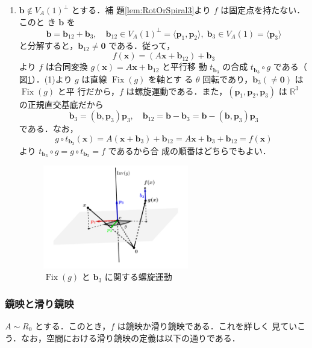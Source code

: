 \documentclass[11pt, uplatex, dvipdfmx, titlepage]{jsarticle}
\makeatletter
\DeclareMathOperator{\Fix}{Fix}
\renewenvironment{proof}[1][\proofname]{\par
  \pushQED{\qed}%
  \normalfont \topsep6\p@\@plus6\p@\relax
  \trivlist
  \item[\hskip\labelsep
         \bfseries
    {#1}]\ignorespaces
}{%
  \popQED\endtrivlist\@endpefalse
}
\theoremstyle{definition}
\renewcommand{\proofname}{\textbf{証明}}
\makeatother
\begin{document}
\begin{proof}[定理\ref{thm:RotOrSpiral3}の証明]
\begin{enumerate}[(1)]
  \item $\bm{b} \notin V_A(1)^{\perp}$ とする．補
    題\ref{lem:RotOrSpiral3}より $f$ は固定点を持たない．このと
    き $\bm{b}$ を
    \[
      \bm{b} = \bm{b}_{12} + \bm{b}_3 , \quad \bm{b}_{12} \in
      V_A(1)^{\perp}=\langle \bm{p}_1, \bm{p}_2 \rangle, \; \bm{b}_{3} \in
      V_A(1)=\langle \bm{p}_3\rangle
    \]
    と分解すると，$\bm{b}_{12} \neq \bm{0}$ である．従って，
    \[
      f(\bm{x}) = \left( A\bm{x} + \bm{b}_{12}\right) + \bm{b}_3
    \]
    より $f$ は合同変換 $g(\bm{x}) = A\bm{x} + \bm{b}_{12}$ と平行移
    動 $t_{\bm{b}_3}$ の合成 $t_{\bm{b}_{3}} \circ g$ である（
    図\ref{fig:spiral3}）．(1)より $g$ は直線 $\Fix(g)$ を軸とす
    る $\theta$ 回転であり，$\bm{b}_3 (\neq \bm{0})$ は $\Fix(g)$ と平
    行だから，$f$ は螺旋運動である．また，$(\bm{p}_1, \bm{p}_2,
    \bm{p}_3)$ は $\mathbb{R}^3$ の正規直交基底だから
    \[
      \bm{b}_{3} = (\bm{b}, \bm{p}_3) \bm{p}_3,\quad \bm{b}_{12} =
      \bm{b}-\bm{b}_{3} = \bm{b} - (\bm{b},\bm{p}_3)\bm{p}_3
    \]
    である．なお，
    \[
      g \circ t_{\bm{b}_3} (\bm{x}) = A(\bm{x} + \bm{b}_3) + \bm{b}_{12} =
      A\bm{x} + \bm{b}_3 + \bm{b}_{12} = f(\bm{x})
    \]
    より $t_{\bm{b}_3} \circ g = g \circ t_{\bm{b}_3} = f$ であるから合
    成の順番はどちらでもよい．
    \begin{figure}[h]
      \centering
      \includegraphics[height=4.5cm]{pictures/spiral3.pdf}
      \caption{$\Fix(g)$ と $\bm{b}_3$ に関する螺旋運動}
      \label{fig:spiral3}
    \end{figure}
  \end{enumerate}
\end{proof}

\subsubsection{鏡映と滑り鏡映}\label{sec:RefGlide3}

$A \sim R_0$ とする．このとき，$f$ は鏡映か滑り鏡映である．これを詳しく
見ていこう．なお，空間における滑り鏡映の定義は以下の通りである．
\end{document}
